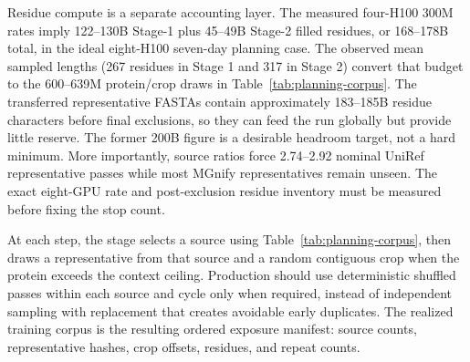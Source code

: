 \documentclass{article}
\begin{document}
\begin{table}[H]
  \centering
  \scriptsize
  \setlength{\tabcolsep}{3.0pt}
  \caption{Large-run planning reservoir, not the first local training corpus. All quantities except draw probabilities and epochs are millions of proteins or protein/crop exposures; no residue count appears here. The global exact-unique count is lower than the sum of source-present rows because some sequences belong to multiple source arms. Counts are pre-exclusion ceilings from Table~\ref{tab:transfer}.}
  \label{tab:planning-corpus}
\end{table}

Residue compute is a separate accounting layer. The measured four-H100 300M
rates imply 122--130B Stage-1 plus 45--49B Stage-2 filled residues, or 168--178B
total, in the ideal eight-H100 seven-day planning case. The observed mean sampled
lengths (267 residues in Stage 1 and 317 in Stage 2) convert that budget to the
600--639M protein/crop draws in Table~\ref{tab:planning-corpus}. The transferred
representative FASTAs contain approximately 183--185B residue characters before
final exclusions, so they can feed the run globally but provide little reserve.
The former 200B figure is a desirable headroom target, not a hard minimum. More
importantly, source ratios force 2.74--2.92 nominal UniRef representative passes
while most MGnify representatives remain unseen. The exact eight-GPU rate and
post-exclusion residue inventory must be measured before fixing the stop count.

At each step, the stage selects a source using Table~\ref{tab:planning-corpus},
then draws a representative from that source and a random contiguous crop when
the protein exceeds the context ceiling. Production should use deterministic
shuffled passes within each source and cycle only when required, instead of
independent sampling with replacement that creates avoidable early duplicates.
The realized training corpus is the resulting ordered exposure manifest: source
counts, representative hashes, crop offsets, residues, and repeat counts.
\end{document}
